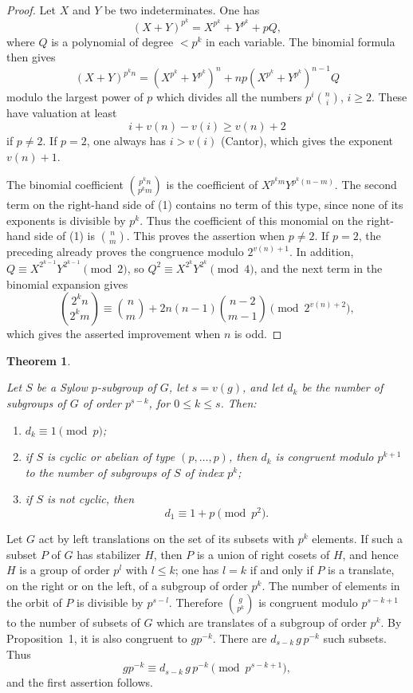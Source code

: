 \documentclass[12pt]{amsart}
\theoremstyle{plain}
\newtheorem*{theorem}{Theorem}
\begin{document}
\begin{proof}
Let $X$ and $Y$ be two indeterminates. One has
\[
(X+Y)^{p^k}=X^{p^k}+Y^{p^k}+pQ,
\]
where $Q$ is a polynomial of degree $<p^k$ in each variable. The binomial formula then gives
\begin{equation}
(X+Y)^{p^k n}=(X^{p^k}+Y^{p^k})^n+np(X^{p^k}+Y^{p^k})^{n-1}Q
\end{equation}
modulo the largest power of $p$ which divides all the numbers $p^i\binom{n}{i}$, $i\geq 2$. These have valuation at least
\[
i+v(n)-v(i)\geq v(n)+2
\]
if $p\neq 2$. If $p=2$, one always has $i>v(i)$ (Cantor), which gives the exponent $v(n)+1$.

The binomial coefficient $\binom{p^k n}{p^k m}$ is the coefficient of $X^{p^k m}Y^{p^k(n-m)}$. The second term on the right-hand side of (1) contains no term of this type, since none of its exponents is divisible by $p^k$. Thus the coefficient of this monomial on the right-hand side of (1) is $\binom{n}{m}$. This proves the assertion when $p\neq 2$. If $p=2$, the preceding already proves the congruence modulo $2^{v(n)+1}$. In addition, $Q\equiv X^{2^{k-1}}Y^{2^{k-1}}\pmod 2$, so $Q^2\equiv X^{2^k}Y^{2^k}\pmod 4$, and the next term in the binomial expansion gives
\[
\binom{2^k n}{2^k m}\equiv \binom{n}{m}+2n(n-1)\binom{n-2}{m-1}\pmod {2^{v(n)+2}},
\]
which gives the asserted improvement when $n$ is odd.
\end{proof}

\begin{theorem}\ \par
Let $S$ be a Sylow $p$-subgroup of $G$, let $s=v(g)$, and let $d_k$ be the number of subgroups of $G$ of order $p^{s-k}$, for $0\leq k\leq s$. Then:
\begin{enumerate}
\item[(i)] $d_k\equiv 1\pmod p$;
\item[(ii)] if $S$ is cyclic or abelian of type $(p,\ldots,p)$, then $d_k$ is congruent modulo $p^{k+1}$ to the number of subgroups of $S$ of index $p^k$;
\item[(iii)] if $S$ is not cyclic, then
\[
d_1\equiv 1+p\pmod {p^2}.
\]
\end{enumerate}
\end{theorem}

Let $G$ act by left translations on the set of its subsets with $p^k$ elements. If such a subset $P$ of $G$ has stabilizer $H$, then $P$ is a union of right cosets of $H$, and hence $H$ is a group of order $p^l$ with $l\leq k$; one has $l=k$ if and only if $P$ is a translate, on the right or on the left, of a subgroup of order $p^k$. The number of elements in the orbit of $P$ is divisible by $p^{s-l}$. Therefore $\binom{g}{p^k}$ is congruent modulo $p^{s-k+1}$ to the number of subsets of $G$ which are translates of a subgroup of order $p^k$. By Proposition~1, it is also congruent to $gp^{-k}$. There are $d_{s-k}\,g\,p^{-k}$ such subsets. Thus
\[
gp^{-k}\equiv d_{s-k}\,g\,p^{-k}\pmod {p^{s-k+1}},
\]
and the first assertion follows.
\end{document}
